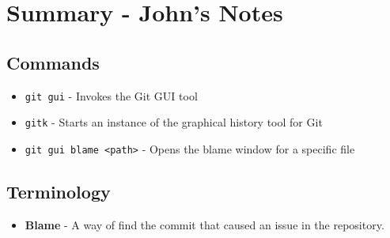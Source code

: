 \clearpage
\section{Summary - John's Notes}
\subsection{Commands}
\begin{itemize}
\item\texttt{git gui} - Invokes the Git GUI tool
\item\texttt{gitk} - Starts an instance of the graphical history tool for Git
\item\texttt{git gui blame <path>} - Opens the blame window for a specific file
\end{itemize}

\subsection{Terminology}
\begin{itemize}
\item\textbf{Blame} - A way of find the commit that caused an issue in the repository.
\end{itemize}
